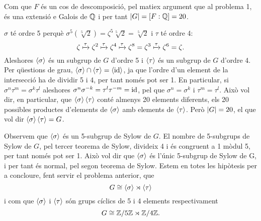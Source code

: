 \documentclass[12pt]{article}
\begin{document}
\parbreak

Com que \( F \) és un cos de descomposició, pel matiex argument que al problema 1, és una
extensió e Galois de \( \mathbb{Q} \) i per tant \( \left\lvert G \right\rvert = [F : \mathbb{Q}] = 20 \).

\( \sigma \) té ordre 5 perquè \( \sigma^5(\sqrt[5]{2}) = \zeta^5 \sqrt[5]{2} =
\sqrt[5]{2} \) i \( \tau \) té ordre 4:
\begin{equation*}
	\zeta \xmapsto{\tau} \zeta^2 \xmapsto{\tau} \zeta^4 \xmapsto{\tau} \zeta^8 = \zeta^3
	\xmapsto{\tau} \zeta^6 = \zeta.
\end{equation*}
Aleshores \( \left\langle \sigma \right\rangle \) és un subgrup de \( G \) d'ordre 5 i \( \left\langle \tau \right\rangle \) és un
subgrup de \( G \) d'ordre 4. Per qüestions de grau, \( \left\langle \sigma \right\rangle \cap \left\langle \tau \right\rangle =
\left\langle \mathrm{id} \right\rangle \), ja que l'ordre d'un element de la intersecció ha de dividir 5 i 4, per tant
només pot ser 1. En particular, si \( \sigma^n \tau^m = \sigma^k \tau^l \) aleshores \(
\sigma^n \sigma^{-k} = \tau^l \tau^{-m} = \mathrm{id} \), pel que \( \sigma^n = \sigma^k \) i
\( \tau^m = \tau^l \). Això vol dir, en particular, que \( \left\langle \sigma \right\rangle\left\langle \tau \right\rangle \) conté
almenys 20 elements diferents, els 20 possibles productes d'elements de \( \left\langle \sigma \right\rangle \)
amb elements de \( \left\langle \tau \right\rangle \). Però \( \left\lvert G \right\rvert = 20 \), el que vol dir \(
\left\langle \sigma \right\rangle\left\langle \tau \right\rangle = G \). 

Observem que \( \left\langle \sigma \right\rangle \) és un 5-subgrup de Sylow de \( G \). El nombre de
5-subgrups de Sylow de \( G \), pel tercer teorema de Sylow, divideix 4 i és congruent a
1 mòdul 5, per tant només pot ser 1. Això vol dir que \( \left\langle \sigma \right\rangle \) és l'únic
5-subgrup de Sylow de G, i per tant és normal, pel segon teorema de Sylow. Estem en totes
les hipòtesis per a concloure, fent servir el problema anterior, que 
\begin{equation*}
	G \cong \left\langle \sigma \right\rangle \rtimes \left\langle \tau \right\rangle
\end{equation*}
i com que \( \left\langle \sigma \right\rangle \) i \( \left\langle \tau \right\rangle \) són grups cíclics de 5 i 4 elements
respectivament
\begin{equation*}
	G \cong \mathbb{Z}/5\mathbb{Z} \rtimes \mathbb{Z}/4\mathbb{Z}.
\end{equation*}
\end{document}
